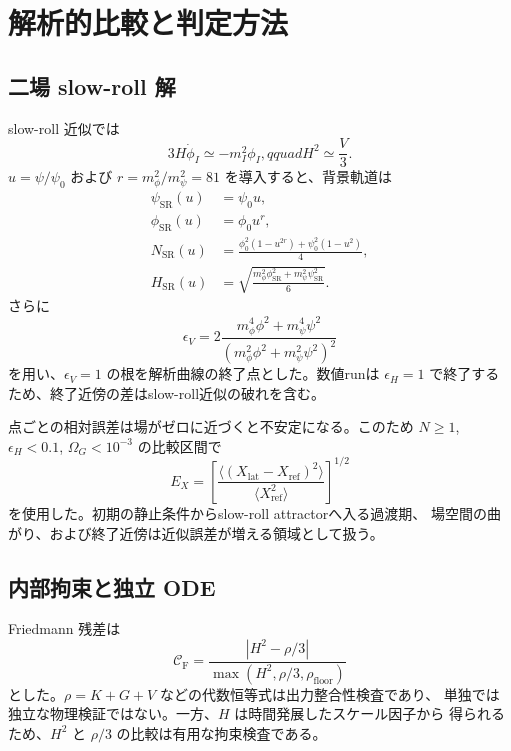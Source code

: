 \documentclass[a4paper,11pt]{ltjsarticle}
\newcommand{\cF}{\mathcal{C}_{\mathrm F}}
\begin{document}
\section{解析的比較と判定方法}

\subsection{二場 slow-roll 解}

slow-roll 近似では
\begin{equation}
 3H\dot\phi_I\simeq-m_I^2\phi_I,qquad
 H^2\simeq\frac{V}{3}.
\end{equation}
$u=\psi/\psi_0$ および
$r=m_\phi^2/m_\psi^2=81$ を導入すると、背景軌道は
\begin{align}
 \psi_{\mathrm{SR}}(u)&=\psi_0u,\\
 \phi_{\mathrm{SR}}(u)&=\phi_0u^r,\\
 N_{\mathrm{SR}}(u)&=
 \frac{\phi_0^2(1-u^{2r})+\psi_0^2(1-u^2)}{4},\\
 H_{\mathrm{SR}}(u)&=
 \sqrt{\frac{m_\phi^2\phi_{\mathrm{SR}}^2+m_\psi^2\psi_{\mathrm{SR}}^2}{6}}.
\end{align}
さらに
\begin{equation}
 \epsilon_V=2\frac{m_\phi^4\phi^2+m_\psi^4\psi^2}
 {(m_\phi^2\phi^2+m_\psi^2\psi^2)^2}
\end{equation}
を用い、$\epsilon_V=1$ の根を解析曲線の終了点とした。数値runは
$\epsilon_H=1$ で終了するため、終了近傍の差はslow-roll近似の破れを含む。

点ごとの相対誤差は場がゼロに近づくと不安定になる。このため
$N\geq1$, $\epsilon_H<0.1$, $\Omega_G<10^{-3}$ の比較区間で
\begin{equation}
 E_X=\left[
 \frac{\langle(X_{\mathrm{lat}}-X_{\mathrm{ref}})^2\rangle}
 {\langle X_{\mathrm{ref}}^2\rangle}
 \right]^{1/2}
\end{equation}
を使用した。初期の静止条件からslow-roll attractorへ入る過渡期、
場空間の曲がり、および終了近傍は近似誤差が増える領域として扱う。

\subsection{内部拘束と独立 ODE}

Friedmann 残差は
\begin{equation}
 \cF=\frac{|H^2-\rho/3|}
 {\max(H^2,\rho/3,\rho_{\mathrm{floor}})}
\end{equation}
とした。$\rho=K+G+V$ などの代数恒等式は出力整合性検査であり、
単独では独立な物理検証ではない。一方、$H$ は時間発展したスケール因子から
得られるため、$H^2$ と $\rho/3$ の比較は有用な拘束検査である。
\end{document}
